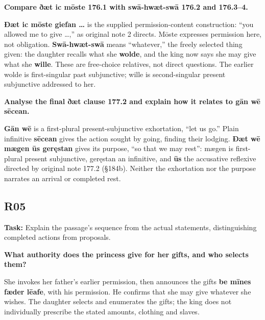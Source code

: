 \textbf{Compare ðæt ic mōste 176.1 with swā-hwæt-swā 176.2 and 176.3–4.}

\textbf{Ðæt ic mōste giefan …} is the supplied permission-content construction: “you allowed me to give …,” as original note 2 directs. Mōste expresses permission here, not obligation. \textbf{Swā-hwæt-swā} means “whatever,” the freely selected thing given: the daughter recalls what she \textbf{wolde}, and the king now says she may give what she \textbf{wille}. These are free-choice relatives, not direct questions. The earlier wolde is first-singular past subjunctive; wille is second-singular present subjunctive addressed to her.

\textbf{Analyse the final ðæt clause 177.2 and explain how it relates to gān wē sēcean.}

\textbf{Gān wē} is a first-plural present-subjunctive exhortation, “let us go.” Plain infinitive \textbf{sēcean} gives the action sought by going, finding their lodging. \textbf{Ðæt wē mægen ūs geręstan} gives its purpose, “so that we may rest”: mægen is first-plural present subjunctive, geręstan an infinitive, and \textbf{ūs} the accusative reflexive directed by original note 177.2 (§184b). Neither the exhortation nor the purpose narrates an arrival or completed rest.

\subsection*{R05}

\textbf{Task:} Explain the passage’s sequence from the actual statements, distinguishing completed actions from proposals.

\textbf{What authority does the princess give for her gifts, and who selects them?}

She invokes her father’s earlier permission, then announces the gifts \textbf{be mīnes fæder lēafe}, with his permission. He confirms that she may give whatever she wishes. The daughter selects and enumerates the gifts; the king does not individually prescribe the stated amounts, clothing and slaves.

